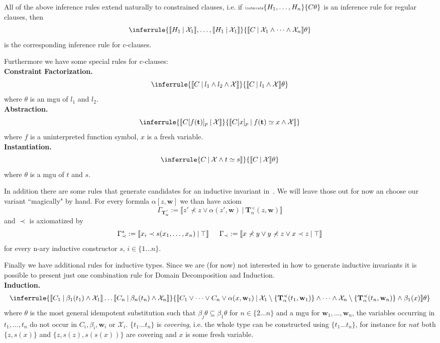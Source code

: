 \documentclass[onehalfspacing]{article}
\newcommand{\llb}{\llbracket}
\newcommand{\rrb}{\rrbracket}
\begin{document}
All of the above inference rules extend naturally to constrained clauses, i.e. if $\tiny{\inferrule{H_1,\dots,H_n}{C\theta}}$ is an inference rule for regular clauses, then $$\inferrule{\llb H_1\:|\:\mathcal X_1\rrb,\dots,\llb H_1\:|\:\mathcal X_1\rrb}{\llb C\:|\:\mathcal X_1\wedge\dots\wedge\mathcal X_n\rrb\theta}$$ is the corresponding inference rule for c-clauses.

Furthermore we have some special rules for c-clauses:\\
\textbf{Constraint Factorization.}
$$\inferrule{\llb C\:|\:l_1\wedge l_2\wedge \mathcal{X}\rrb}{\llb C\:|\:l_1\wedge \mathcal{X}\rrb\theta}$$where $\theta$ is an mgu of $l_1$ and $l_2$.\\
\textbf{Abstraction.}
$$\inferrule{\llb C[f(\mathbf{t})]_p\:|\:\mathcal{X}\rrb}{\llb C[x]_p\:|\:f(\mathbf{t})\simeq x\wedge\mathcal{X}\rrb}$$ where $f$ is a uninterpreted function symbol, $x$ is a fresh variable.\\
\textbf{Instantiation.}
$$\inferrule{C\:|\:\mathcal{X}\wedge t\simeq s\rrb}{\llb C\:|\:\mathcal{X}\rrb\theta}$$
where $\theta$ is a mgu of $t$ and $s$.

In addition there are some rules that generate candidates for an inductive invariant in~\cite{Echenim_2019}. We will leave those out for now an choose our variant ``magically" by hand. For every formula $\alpha[z,\textbf{w}]$ we than have axiom $$\Gamma_\mathbf{T_\alpha^\prec}:= \llb z' \not\prec z\vee \alpha(z', \mathbf{w})\:|\:\mathbf{T}_\alpha^\prec(z,\mathbf{w})\rrb$$ and $\prec $ is axiomatized by $$\Gamma_\prec^s:=\llb x_i\prec s(x_1,\dots, x_n)\:|\:\top\rrb\indent \Gamma_\prec:=\llb x\not\prec y\vee y\not\prec z\vee x\prec z\:|\:\top\rrb$$for every n-ary inductive constructor $s$, $i\in\{1\dots n\}$.

Finally we have additional rules for inductive types. Since we are (for now) not interested in how to generate inductive invariants it is possible to present just one combination rule for Domain Decomposition and Induction.\\
\textbf{Induction.}
$$\inferrule{\llb C_1\:|\:\beta_1(t_1)\wedge \mathcal{X}_1\rrb\dots\llb C_n\:|\:\beta_n(t_n)\wedge \mathcal{X}_n\rrb}{\llb C_1\vee\dots\vee C_n\vee \alpha(x,\mathbf{w}_1)\:|\:\mathcal{X}_1\setminus\{\mathbf{T}_{\alpha}^\prec(t_1,\mathbf w_1)\}\wedge\dots\wedge\mathcal{X}_n\setminus\{\mathbf{T}_{\alpha}^\prec(t_n,\mathbf w_n)\}\wedge\beta_1(x)\rrb\theta}$$where $\theta$ is the most general idempotent substitution such that $\beta_j\theta\subseteq\beta_1\theta$ for $n\in\{2\dots n\}$ and a mgu for $\mathbf{w}_1,\dots,\mathbf{w}_n$, the variables occurring in $t_1,\dots,t_n$ do not occur in $C_i,\beta_i,\mathbf{w}_i$ or $\mathcal{X}_i$. $\{t_1\dots t_n\}$ is \textit{covering}, i.e. the whole type can be constructed using $\{t_1\dots t_n\}$, for instance for $nat$ both $\{z, s(x)\}$ and $\{z, s(z), s(s(x))\}$ are covering and $x$ is some fresh variable.
\end{document}
